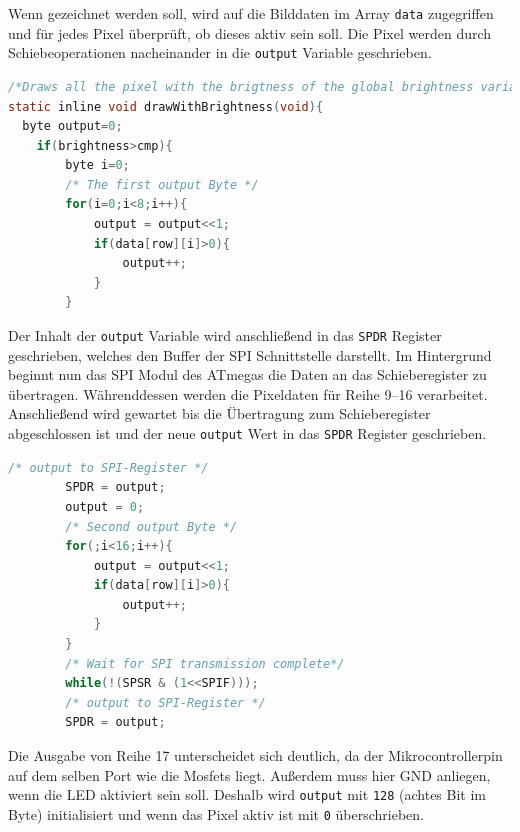 Wenn gezeichnet werden soll, wird auf die Bilddaten im Array \texttt{data}
zugegriffen und für jedes Pixel überprüft, ob dieses aktiv sein soll. Die Pixel
werden durch Schiebeoperationen nacheinander in die \texttt{output} Variable
geschrieben. 

\begin{lstlisting}[language=C,caption=Zeichenmethode zur
Ansteuerung der LED Matrix: Teil 1] 
/*Draws all the pixel with the brigtness of the global brightness variable*/ 
static inline void drawWithBrightness(void){ 
  byte output=0;
	if(brightness>cmp){
		byte i=0;
		/* The first output Byte */
		for(i=0;i<8;i++){
			output = output<<1;
			if(data[row][i]>0){
				output++;
			}
		}
\end{lstlisting} 

Der Inhalt der \texttt{output} Variable wird anschließend in das
\texttt{SPDR} Register geschrieben, welches den Buffer der SPI Schnittstelle
darstellt. Im Hintergrund beginnt nun das SPI Modul des ATmegas die Daten an das
Schieberegister zu übertragen. Währenddessen werden die Pixeldaten für Reihe
9--16 verarbeitet. Anschließend wird gewartet bis die Übertragung zum
Schieberegister abgeschlossen ist und der neue \texttt{output} Wert in das
\texttt{SPDR} Register geschrieben.

\begin{lstlisting}[language=C,caption=Zeichenmethode zur
Ansteuerung der LED Matrix: Teil 2]
		/* output to SPI-Register */
		SPDR = output;
		output = 0;
		/* Second output Byte */
		for(;i<16;i++){
			output = output<<1;
			if(data[row][i]>0){
				output++;
			}
		}
		/* Wait for SPI transmission complete*/
		while(!(SPSR & (1<<SPIF)));
		/* output to SPI-Register */
		SPDR = output;
\end{lstlisting} 

Die Ausgabe von Reihe 17 unterscheidet sich deutlich, da der Mikrocontrollerpin
auf dem selben Port wie die Mosfets liegt. Außerdem muss hier GND anliegen, wenn
die LED aktiviert sein soll. Deshalb wird \texttt{output} mit \texttt{128}
(achtes Bit im Byte) initialisiert und wenn das Pixel aktiv ist mit \texttt{0}
überschrieben.

